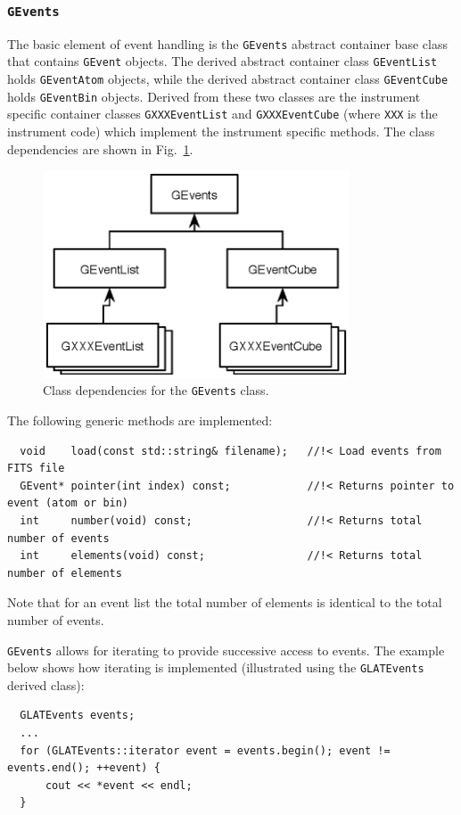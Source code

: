 \documentclass{article}[12pt,a4]
\begin{document}
\subsubsection{{\tt GEvents}}

The basic element of event handling is the {\tt GEvents} abstract container base class that
contains {\tt GEvent} objects.
The derived abstract container class {\tt GEventList} holds {\tt GEventAtom} objects, 
while the derived abstract container class {\tt GEventCube} holds {\tt GEventBin} objects.
Derived from these two classes are the instrument specific container classes
{\tt GXXXEventList} and {\tt GXXXEventCube} (where {\tt XXX} is the instrument code)
which implement the instrument specific methods.
The class dependencies are shown in Fig.~\ref{fig:GEvents}.
%
%
\begin{figure}[!h]
\centering
\includegraphics[width=9.1cm]{GEvents.eps}
\caption{Class dependencies for the {\tt GEvents} class.}
\label{fig:GEvents}
\end{figure}
%
%
The following generic methods are implemented:
\begin{verbatim}
  void    load(const std::string& filename);   //!< Load events from FITS file
  GEvent* pointer(int index) const;            //!< Returns pointer to event (atom or bin)
  int     number(void) const;                  //!< Returns total number of events
  int     elements(void) const;                //!< Returns total number of elements
\end{verbatim}
Note that for an event list the total number of elements is identical to the total
number of events.

{\tt GEvents} allows for iterating to provide successive access to events.
The example below shows how iterating is implemented (illustrated using
the {\tt GLATEvents} derived class):
\begin{verbatim}
  GLATEvents events;
  ...
  for (GLATEvents::iterator event = events.begin(); event != events.end(); ++event) {
      cout << *event << endl;
  }
\end{verbatim}
\end{document}
